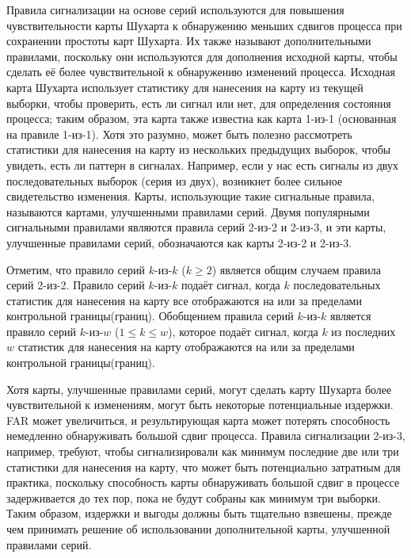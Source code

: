 Правила сигнализации на основе серий используются для повышения чувствительности карты Шухарта к обнаружению меньших сдвигов процесса при сохранении простоты карт Шухарта. Их также называют дополнительными правилами, поскольку они используются для дополнения исходной карты, чтобы сделать её более чувствительной к обнаружению изменений процесса. Исходная карта Шухарта использует статистику для нанесения на карту из текущей выборки, чтобы проверить, есть ли сигнал или нет, для определения состояния процесса; таким образом, эта карта также известна как карта 1-из-1 (основанная на правиле 1-из-1). Хотя это разумно, может быть полезно рассмотреть статистики для нанесения на карту из нескольких предыдущих выборок, чтобы увидеть, есть ли паттерн в сигналах. Например, если у нас есть сигналы из двух последовательных выборок (серия из двух), возникнет более сильное свидетельство изменения. Карты, использующие такие сигнальные правила, называются картами, улучшенными правилами серий. Двумя популярными сигнальными правилами являются правила серий 2-из-2 и 2-из-3, и эти карты, улучшенные правилами серий, обозначаются как карты 2-из-2 и 2-из-3.

Отметим, что правило серий \(k\)-из-\(k\) (\(k \geq 2\)) является общим случаем правила серий 2-из-2. Правило серий \(k\)-из-\(k\) подаёт сигнал, когда \(k\) последовательных статистик для нанесения на карту все отображаются на или за пределами контрольной границы(границ). Обобщением правила серий \(k\)-из-\(k\) является правило серий \(k\)-из-\(w\) (\(1 \leq k \leq w\)), которое подаёт сигнал, когда \(k\) из последних \(w\) статистик для нанесения на карту отображаются на или за пределами контрольной границы(границ).

Хотя карты, улучшенные правилами серий, могут сделать карту Шухарта более чувствительной к изменениям, могут быть некоторые потенциальные издержки. FAR может увеличиться, и результирующая карта может потерять способность немедленно обнаруживать большой сдвиг процесса. Правила сигнализации 2-из-3, например, требуют, чтобы сигнализировали как минимум последние две или три статистики для нанесения на карту, что может быть потенциально затратным для практика, поскольку способность карты обнаруживать большой сдвиг в процессе задерживается до тех пор, пока не будут собраны как минимум три выборки. Таким образом, издержки и выгоды должны быть тщательно взвешены, прежде чем принимать решение об использовании дополнительной карты, улучшенной правилами серий.

